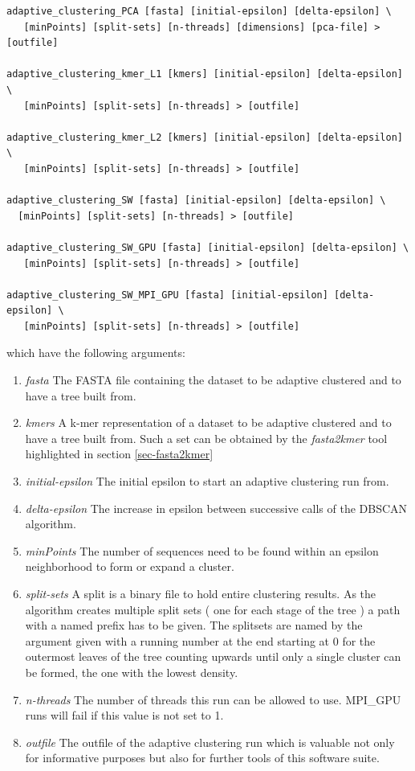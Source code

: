 \begin{lstlisting}
adaptive_clustering_PCA [fasta] [initial-epsilon] [delta-epsilon] \
   [minPoints] [split-sets] [n-threads] [dimensions] [pca-file] > [outfile]

adaptive_clustering_kmer_L1 [kmers] [initial-epsilon] [delta-epsilon] \
   [minPoints] [split-sets] [n-threads] > [outfile]

adaptive_clustering_kmer_L2 [kmers] [initial-epsilon] [delta-epsilon] \
   [minPoints] [split-sets] [n-threads] > [outfile]

adaptive_clustering_SW [fasta] [initial-epsilon] [delta-epsilon] \
  [minPoints] [split-sets] [n-threads] > [outfile]

adaptive_clustering_SW_GPU [fasta] [initial-epsilon] [delta-epsilon] \
   [minPoints] [split-sets] [n-threads] > [outfile]

adaptive_clustering_SW_MPI_GPU [fasta] [initial-epsilon] [delta-epsilon] \
   [minPoints] [split-sets] [n-threads] > [outfile]
\end{lstlisting}
which have the following arguments:
\begin{enumerate}
  \item \emph{fasta} The FASTA file containing the dataset to be
    adaptive clustered and to have a tree built from.
  \item \emph{kmers} A k-mer representation of a dataset to be
    adaptive clustered and to have a tree built from. Such a set can
    be obtained by the \emph{fasta2kmer} tool highlighted in section
    \ref{sec-fasta2kmer}
  \item \emph{initial-epsilon} The initial epsilon to start an adaptive
    clustering run from.
  \item \emph{delta-epsilon} The increase in epsilon between
    successive calls of the DBSCAN algorithm.
  \item \emph{minPoints} The number of sequences need to be found
    within an epsilon neighborhood to form or expand a cluster.
  \item \emph{split-sets} A split is a binary file to hold entire clustering
    results. As the algorithm creates multiple split sets ( one for
    each stage of the tree ) a path with a named prefix has to be
    given. The splitsets are named by the argument given with a
    running number at the end starting at 0 for the outermost leaves
    of the tree counting upwards until only a single cluster can be
    formed, the one with the lowest density.
  \item \emph{n-threads} The number of threads this run can be allowed
    to use. MPI\_GPU runs will fail if this value is not set to 1.
  \item \emph{outfile} The outfile of the adaptive clustering run
    which is valuable not only for informative purposes but also for
    further tools of this software suite.
\end{enumerate}

